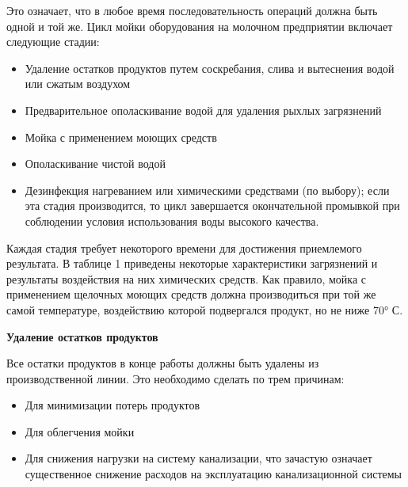 \documentclass[a4paper,12pt,oneside]{extarticle}
\begin{document}
	\begin{flushleft}
			Это означает, что в любое время последовательность операций должна быть одной и той же. Цикл мойки оборудования на молочном предприятии включает следующие стадии:
	\end{flushleft}
	
	\begin{itemize}
		\item Удаление остатков продуктов путем соскребания, слива и вытеснения водой или сжатым воздухом
		\item Предварительное ополаскивание водой для удаления рыхлых загрязнений
		\item Мойка с применением моющих средств
		\item Ополаскивание чистой водой
		\item Дезинфекция нагреванием или химическими средствами (по выбору); если эта стадия производится, то цикл завершается окончательной промывкой при соблюдении условия использования воды высокого качества.  
	\end{itemize}
	
	\begin{flushleft}
		Каждая стадия требует некоторого времени для достижения приемлемого результата.
		В таблице 1 приведены некоторые характеристики загрязнений и результаты воздействия на них химических средств.
		Как правило, мойка с применением щелочных моющих средств должна производиться при той же самой температуре, воздействию которой подвергался продукт, но не ниже 70° С.
	\end{flushleft}
	
	\begin{flushleft}
		\bfseries 	Удаление остатков продуктов
	\end{flushleft}
	
	\begin{flushleft}
			Все остатки продуктов в конце работы должны быть удалены из производственной линии.
		Это необходимо сделать по трем причинам:
	\end{flushleft}
	
	\begin{itemize}
		\item Для минимизации потерь продуктов
		\item Для облегчения мойки
		\item Для снижения нагрузки на систему канализации, что зачастую означает существенное снижение расходов на эксплуатацию канализационной системы
	\end{itemize}
	
\end{document}
